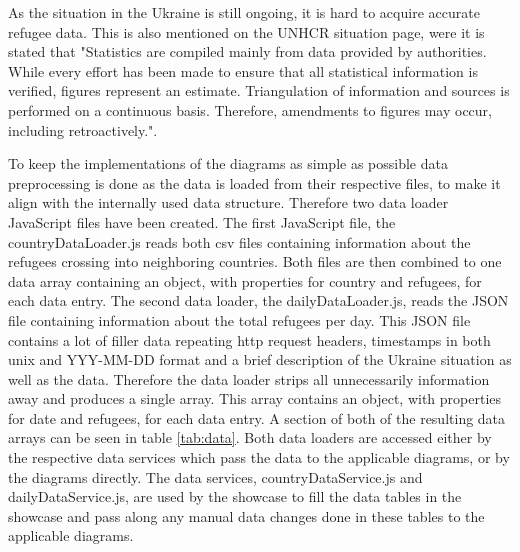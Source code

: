 As the situation in the Ukraine is still ongoing, it is hard to acquire accurate refugee data. This is also mentioned on the UNHCR situation page, were it is stated that "Statistics are compiled mainly from data provided by authorities. While every effort has been made to ensure that all statistical information is verified, figures represent an estimate. Triangulation of information and sources is performed on a continuous basis. Therefore, amendments to figures may occur, including retroactively."\cite{unhcr}.


To keep the implementations of the diagrams as simple as possible data preprocessing is done as the data is loaded from their respective files, to make it align with the internally used data structure. Therefore two data loader JavaScript files have been created. The first JavaScript file, the countryDataLoader.js reads both csv files containing information about the refugees crossing into neighboring countries. Both files are then combined to one data array containing an object, with properties for country and refugees, for each data entry. The second data loader, the dailyDataLoader.js, reads the JSON file containing information about the total refugees per day. This JSON file contains a lot of filler data repeating http request headers, timestamps in both unix and YYY-MM-DD format and a brief description of the Ukraine situation as well as the data. Therefore the data loader strips all unnecessarily information away and produces a single array. This array contains an object, with properties for date and refugees, for each data entry. A section of both of the resulting data arrays can be seen in table \ref{tab:data}. Both data loaders are accessed either by the respective data services which pass the data to the applicable diagrams, or by the diagrams directly. The data services, countryDataService.js and dailyDataService.js, are used by the showcase to fill the data tables in the showcase and pass along any manual data changes done in these tables to the applicable diagrams.

